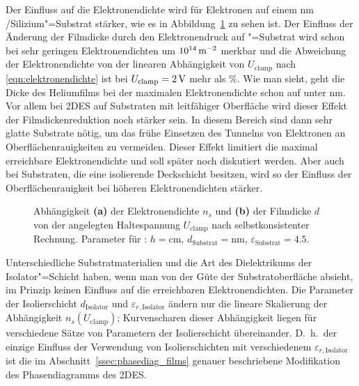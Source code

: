 Der Einfluss auf die Elektronendichte wird für Elektronen auf einem \unit[200]{nm} \SiO/Silizium"=Substrat stärker, wie es in Abbildung~\ref{fig:film_selbstkonsistent} zu sehen ist. Der Einfluss der Änderung der Filmdicke durch den Elektronendruck auf \SiO"=Substrat wird schon bei sehr geringen Elektronendichten um $\unit[10^{14}]{\Em}$ merkbar und die Abweichung der Elektronendichte von der linearen Abhängigkeit von $U_\text{clamp}$ nach \eqref{eqn:elektronendichte} ist bei $U_\text{clamp}=\unit[2]{V}$ mehr als \unit[50]{\%}. Wie man sieht, geht die Dicke des Heliumfilms bei der maximalen Elektronendichte schon auf unter \unit[4]{nm}. Vor allem bei 2DES auf Substraten mit leitfähiger Oberfläche wird dieser Effekt der Filmdickenreduktion noch stärker sein. In diesem Bereich sind dann sehr glatte Substrate nötig, um das frühe Einsetzen des Tunnelns von Elektronen an Oberflächenrauigkeiten zu vermeiden. Dieser Effekt limitiert die maximal erreichbare Elektronendichte und soll später noch diskutiert werden. Aber auch bei Substraten, die eine isolierende Deckschicht besitzen, wird so der Einfluss der Oberflächenrauigkeit bei höheren Elektronendichten stärker. 
\begin{figure}[h!tbp]
	\begin{center}
	\end{center}
	\caption[Elektronendichte auf \SiO, selbstkonsistente Rechnung]{Abhängigkeit {\bfseries (a)} der Elektronendichte $n_s$ und {\bfseries (b)} der Filmdicke $d$ von der angelegten Haltespannung $U_\text{clamp}$ nach selbstkonsistenter Rechnung. Parameter für \SiO: $h=$\unit[1]{cm}, $d_\text{Substrat}=$\unit[200]{nm}, $\varepsilon_\text{Substrat}=4.5$.}\label{fig:film_selbstkonsistent}
\end{figure}

Unterschiedliche Substratmaterialien und die Art des Dielektrikums der Isolator"=Schicht haben, wenn man von der Güte der Substratoberfläche absieht, im Prinzip keinen Einfluss auf die erreichbaren Elektronendichten. Die Parameter der Isolierschicht $d_\text{Isolator}$ und $\varepsilon_{r,\text{Isolator}}$ ändern nur die lineare Skalierung der Abhängigkeit $n_s(U_\text{clamp})$; Kurvenscharen dieser Abhängigkeit liegen für verschiedene Sätze von Parametern der Isolierschicht übereinander. D.~h.\ der einzige Einfluss der Verwendung von Isolierschichten mit verschiedenem $\varepsilon_{r,\text{Isolator}}$ ist die im Abschnitt~\ref{ssec:phasediag_films} genauer beschriebene Modifikation des Phasendiagramms des 2DES.


